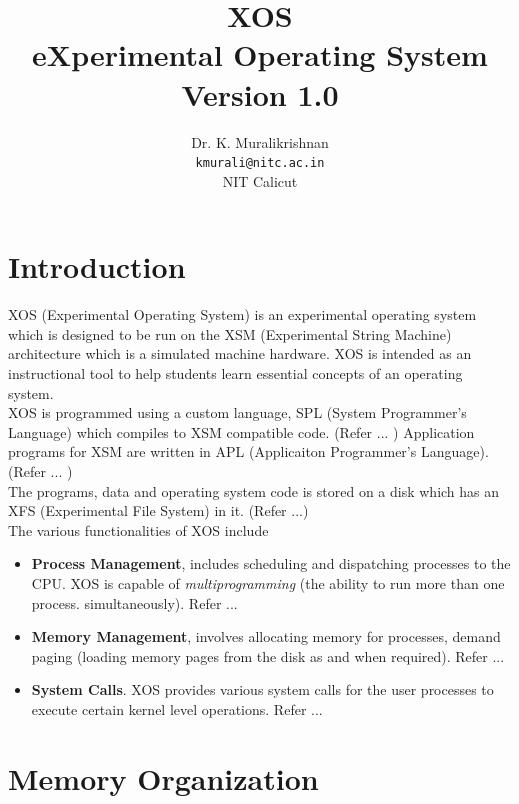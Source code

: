 \documentclass[11pt]{report}
\title{XOS \\ eXperimental Operating System \\
Version 1.0}
\author{Dr. K. Muralikrishnan  \\ \texttt{kmurali@nitc.ac.in} \\ {NIT Calicut} }
\begin{document}
\maketitle
\pagebreak

\thispagestyle{plain}

\tableofcontents
\pagebreak

\chapter{Introduction}
\label{chp:osintro}

XOS (Experimental Operating System) is an experimental operating system  which is designed to be run on the  XSM  (Experimental String Machine) architecture which is a simulated machine hardware. XOS is intended as an instructional tool to help students learn essential concepts of an operating system. 
\vspace{0.1in} \\
XOS is programmed using a custom language, SPL (System Programmer's Language) which compiles to XSM compatible code. (Refer ... ) Application programs for XSM are written in APL (Applicaiton Programmer's Language). (Refer ... ) 
\vspace{0.1in} \\
The programs, data and operating system code is stored on a disk which has an XFS (Experimental File System) in it. (Refer ...)\\

The various functionalities of XOS include
\begin{itemize}
\item \textbf{Process Management}, includes scheduling and dispatching processes to the CPU. XOS is capable of \textit{multiprogramming} (the ability to run more than one process.  simultaneously). Refer ...
\item \textbf{Memory Management}, involves allocating memory for processes, demand paging (loading memory pages from the disk as and when required). Refer ...
\item \textbf{System Calls}. XOS provides various system calls for the user processes to execute certain kernel level operations. Refer ...
\end{itemize} 


\chapter{Memory Organization}
\label{chp:memoryorg}
\end{document}
